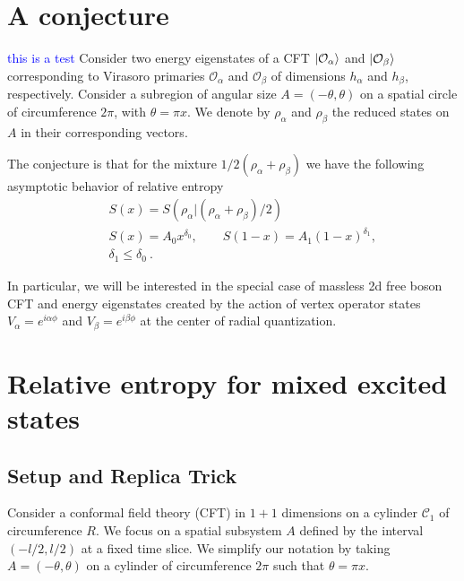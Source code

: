 \documentclass[11pt]{article}
\newcommand{\mO}{\mathcal{O}}
\newcommand{\nn}{\nonumber}
\newcommand{\NL}[1]{\textcolor{blue}{#1}}
\begin{document}
  \section{A conjecture}
\NL{this is a test}
  Consider two energy eigenstates of a CFT $\ket{\mO_\alpha}$ and
  $\ket{\mO_\beta}$ corresponding to Virasoro primaries $\mO_{\alpha}$ and
  $\mO_{\beta}$ of dimensions $h_{\alpha}$ and $h_{\beta}$, respectively.
  Consider a subregion of angular size $A=(-\theta,\theta)$ on a spatial circle
  of circumference $2\pi$, with $\theta=\pi x$. We denote by $\rho_{\alpha}$ and
  $\rho_{\beta}$ the reduced states on $A$ in their corresponding vectors.

  The conjecture is that for the mixture $1/2(\rho_{\alpha}+\rho_{\beta})$ we
  have the following asymptotic behavior of relative entropy
  \begin{eqnarray}
    &&S(x)=S(\rho_\alpha|(\rho_\alpha+\rho_\beta)/2)\nn\\
    &&S(x)=A_0 x^{\delta_0}, \qquad S(1-x)=A_1(1-x)^{\delta_1},\nn\\
    &&\delta_1\leq \delta_0\ .
  \end{eqnarray}

  In particular, we will be interested in the special case of massless 2d free
  boson CFT and energy eigenstates created by the action of vertex operator
  states $V_{\alpha}=e^{i\alpha\phi}$ and $V_{\beta}= e^{i\beta\phi}$ at the
  center of radial quantization.

  \section{Relative entropy for mixed excited states}

  \subsection*{Setup and Replica Trick}

  Consider a conformal field theory (CFT) in $1+1$ dimensions on a cylinder
  $\mathcal{C}_{1}$ of circumference $R$. We focus on a spatial subsystem $A$ defined
  by the interval $(-l/2, l/2)$ at a fixed time slice. We simplify our notation
  by taking $A=(-\theta,\theta)$ on a cylinder of circumference $2\pi$ such that
  $\theta=\pi x$.
\end{document}
